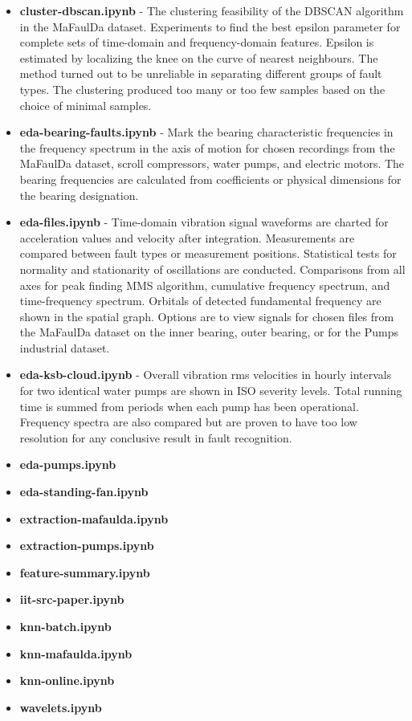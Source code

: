 \begin{itemize}[noitemsep]

\item \textbf{cluster-dbscan.ipynb} - The clustering feasibility of the DBSCAN algorithm in the MaFaulDa dataset. Experiments to find the best epsilon parameter for complete sets of time-domain and frequency-domain features. Epsilon is estimated by localizing the knee on the curve of nearest neighbours. The method turned out to be unreliable in separating different groups of fault types. The clustering produced too many or too few samples based on the choice of minimal samples.

\item \textbf{eda-bearing-faults.ipynb} - Mark the bearing characteristic frequencies in the frequency spectrum in the axis of motion for chosen recordings from the MaFaulDa dataset, scroll compressors, water pumps, and electric motors. The bearing frequencies are calculated from coefficients or physical dimensions for the bearing designation.

\item \textbf{eda-files.ipynb} - Time-domain vibration signal waveforms are charted for acceleration values and velocity after integration. Measurements are compared between fault types or measurement positions. Statistical tests for normality and stationarity of oscillations are conducted. Comparisons from all axes for peak finding MMS algorithm, cumulative frequency spectrum, and time-frequency spectrum. Orbitals of detected fundamental frequency are shown in the spatial graph. Options are to view signals for chosen files from the MaFaulDa dataset on the inner bearing, outer bearing, or for the Pumps industrial dataset.

\item \textbf{eda-ksb-cloud.ipynb} - Overall vibration rms velocities in hourly intervals for two identical water pumps are shown in ISO severity levels. Total running time is summed from periods when each pump has been operational. Frequency spectra are also compared but are proven to have too low resolution for any conclusive result in fault recognition.

\item \textbf{eda-pumps.ipynb}
\item \textbf{eda-standing-fan.ipynb}
\item \textbf{extraction-mafaulda.ipynb}
\item \textbf{extraction-pumps.ipynb}
\item \textbf{feature-summary.ipynb}
\item \textbf{iit-src-paper.ipynb}
\item \textbf{knn-batch.ipynb}
\item \textbf{knn-mafaulda.ipynb}
\item \textbf{knn-online.ipynb}
\item \textbf{wavelets.ipynb}
\end{itemize}

